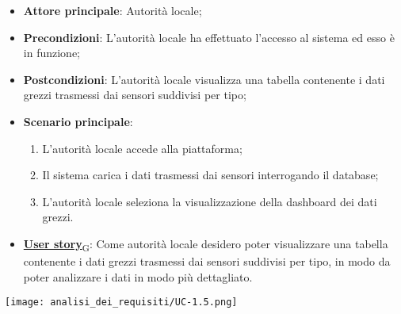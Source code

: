 \begin{itemize}
	\item \textbf{Attore principale}: Autorità locale;
	\item \textbf{Precondizioni}: L'autorità locale ha effettuato l'accesso al sistema ed esso è in funzione;
	\item \textbf{Postcondizioni}: L'autorità locale visualizza una tabella contenente i dati grezzi trasmessi dai sensori suddivisi per tipo;
	\item \textbf{Scenario principale}:
	      \begin{enumerate}
		      \item L'autorità locale accede alla piattaforma;
		      \item Il sistema carica i dati trasmessi dai sensori interrogando il database;
		      \item L'autorità locale seleziona la visualizzazione della dashboard dei dati grezzi.
	      \end{enumerate}
	\item \href{https://7last.github.io/docs/rtb/documentazione-interna/glossario\#user-story}{\textbf{User story}\textsubscript{G}}:
	      Come autorità locale desidero poter visualizzare una tabella contenente i dati grezzi trasmessi dai sensori suddivisi per tipo, in modo da poter analizzare i dati in modo più dettagliato.
\end{itemize}
\begin{center}
	\texttt{[image: analisi\_dei\_requisiti/UC-1.5.png]}
\end{center}


